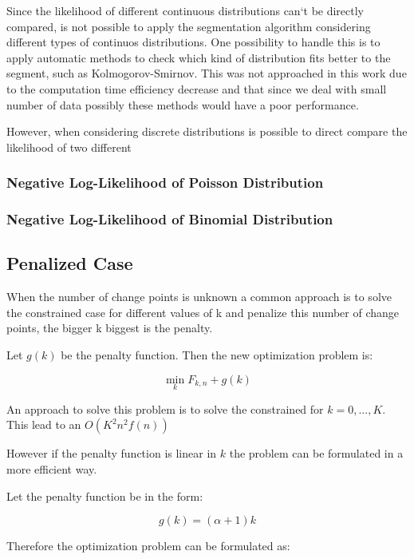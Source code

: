 Since the likelihood of different continuous distributions can`t be directly compared, is not possible to apply the segmentation algorithm considering different types of continuos distributions. One possibility to handle this is to apply automatic methods to check which kind of distribution fits better to the segment, such as Kolmogorov-Smirnov. This was not approached in this work due to the computation time efficiency decrease and that since we deal with small number of data possibly these methods would have a poor performance.

However, when considering discrete distributions is possible to direct compare the likelihood of two different 

\subsubsection{Negative Log-Likelihood of Poisson Distribution}
\subsubsection{Negative Log-Likelihood of Binomial Distribution}

\subsection{Penalized Case}

When the number of change points is unknown a common approach is to solve the constrained case for different values of k and penalize this number of change points, the bigger k biggest is the penalty.

Let $g(k)$ be the penalty function. Then the new optimization problem is:

\begin{equation}
    \min_{k} F_{k, n} + g(k)
\end{equation}

An approach to solve this problem is to solve the constrained for $k = 0, ..., K$. This lead to an $O(K^{2} n^{2} f(n))$

However if the penalty function is linear in $k$ the problem can be formulated in a more efficient way.

Let the penalty function be in the form:

\begin{equation}
    g(k) = (\alpha + 1) k
\end{equation}

Therefore the optimization problem can be formulated as:

